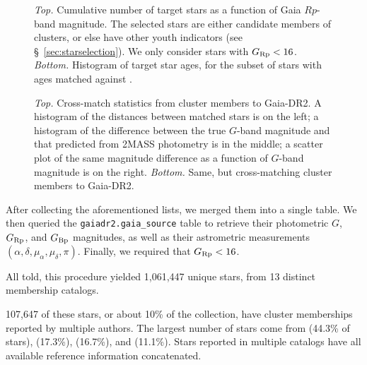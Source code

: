 \documentclass[12pt,twocolumn,tighten]{aastex62}
\begin{document}
\begin{figure}[t]
	\begin{center}
		\leavevmode
    \vspace{-0.8cm}
	\end{center}
	\vspace{-0.8cm}
	\caption{
    {\it Top.} Cumulative number of target stars as
    a function of Gaia $Rp$-band magnitude.  The selected stars are
    either candidate members of clusters, or else have other youth
    indicators (see \S~\ref{sec:starselection}). We only consider
    stars with $G_{\rm Rp} < 16$.
    {\it Bottom.} Histogram of target star ages, for the subset of
    stars with ages matched against \citet{Kharchenko_et_al_2013}.
	\label{fig:cdips_targets}
	}
\end{figure}

\begin{figure}[!ht]
	\vspace{-0.8cm}
	\vspace{-0.8cm}
	\caption{
    {\it Top.} Cross-match statistics from
    \cite{Kharchenko_et_al_2013} cluster members to Gaia-DR2. A
    histogram of the distances between matched stars is on the left; a
    histogram of the difference between the true $G$-band magnitude
    and that predicted from 2MASS photometry is in the middle; a scatter
    plot of the same magnitude difference as a function of $G$-band
    magnitude is on the right.
    {\it Bottom.} Same, but cross-matching \cite{dias_proper_2014}
    cluster members to Gaia-DR2.
	}
	\label{fig:xmatch_info}
\end{figure}


After collecting the aforementioned lists, we
merged them into a single table. We then queried the
\texttt{gaiadr2.gaia\_source} table to retrieve their photometric $G$,
$G_{\rm Rp}$, and $G_{\rm Bp}$ magnitudes, as well as their
astrometric measurements $(\alpha, \delta, \mu_\alpha, \mu_\delta,
\pi)$.  Finally, we required that $G_{\rm Rp} < 16$.  

All told, this procedure yielded 1{,}061{,}447 unique stars, from 13 distinct
membership catalogs.

107{,}647 of these stars, or about
10\% of the collection, have cluster memberships reported by
multiple authors.  The largest number of stars come from
\citealt{dias_proper_2014} (44.3\% of stars), \citealt{Kharchenko_et_al_2013}
(17.3\%), \citealt{cantat-gaudin_gaia_2018} (16.7\%), and \citealt{zari_3d_2018}
(11.1\%). %
Stars reported in multiple catalogs have all available reference information
concatenated.  
\end{document}
